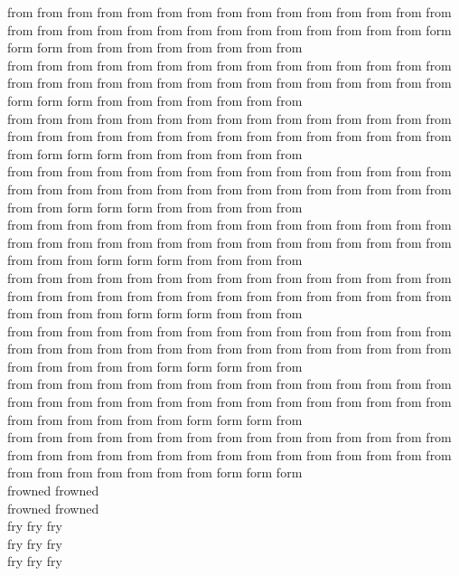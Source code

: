 from from from from from from from from from from from from from from from from from from from from from from from from from from from from from form form form from from from from from from from from\\
from from from from from from from from from from from from from from from from from from from from from from from from from from from from from from form form form from from from from from from from\\
from from from from from from from from from from from from from from from from from from from from from from from from from from from from from from from form form form from from from from from from\\
from from from from from from from from from from from from from from from from from from from from from from from from from from from from from from from from form form form from from from from from\\
from from from from from from from from from from from from from from from from from from from from from from from from from from from from from from from from from form form form from from from from\\
from from from from from from from from from from from from from from from from from from from from from from from from from from from from from from from from from from form form form from from from\\
from from from from from from from from from from from from from from from from from from from from from from from from from from from from from from from from from from from form form form from from\\
from from from from from from from from from from from from from from from from from from from from from from from from from from from from from from from from from from from from form form form from\\
from from from from from from from from from from from from from from from from from from from from from from from from from from from from from from from from from from from from from form form form\\
frowned frowned\\
frowned frowned\\
fry fry fry\\
fry fry fry\\
fry fry fry\\


